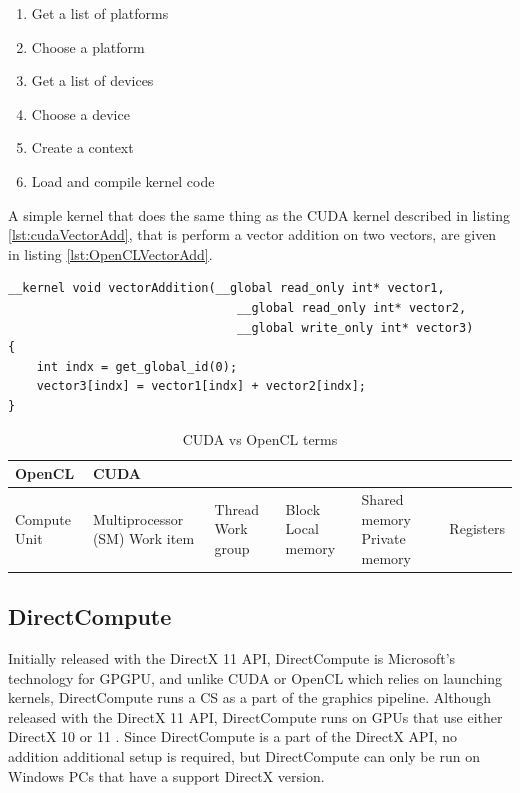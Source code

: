 \begin{enumerate}
    \item Get a list of platforms
    \item Choose a platform
    \item Get a list of devices
    \item Choose a device
    \item Create a context
    \item Load and compile kernel code    
\end{enumerate}

A simple kernel that does the same thing as the CUDA kernel described in listing \ref{lst:cudaVectorAdd}, that is perform a vector addition on two vectors, are given in listing \ref{lst:OpenCLVectorAdd}.

\begin{lstlisting}[caption={OpenCL vector addition kernel}, label={lst:OpenCLVectorAdd}, frame=single] 
__kernel void vectorAddition(__global read_only int* vector1, 
                                __global read_only int* vector2, 
                                __global write_only int* vector3)
{
	int indx = get_global_id(0);
	vector3[indx] = vector1[indx] + vector2[indx];
}
\end{lstlisting}

\begin{table}[!h]
    \begin{tabularx}{\textwidth}{ |X|X| }
      \hline
      \textbf{OpenCL}   &  \textbf{CUDA} \\ \hline 
        Compute Unit    & Multiprocessor (SM)
        Work item       & Thread
        Work group      & Block
        Local memory    & Shared memory
        Private memory  & Registers \\ \hline
    \end{tabularx}
\caption{\label{tab:OpenCLvsCUDA} CUDA vs OpenCL terms}
\end{table}




\subsection{DirectCompute}
Initially released with the DirectX 11 API, DirectCompute is Microsoft's technology for GPGPU, and unlike CUDA or OpenCL which relies on launching kernels, DirectCompute runs a CS as a part of the graphics pipeline. Although released with the DirectX 11 API, DirectCompute runs on GPUs that use either DirectX 10 or 11 \cite{NVidiaDirectCompute}. Since DirectCompute is a part of the DirectX API, no addition additional setup is required, but DirectCompute can only be run on Windows PCs that have a support DirectX version.


